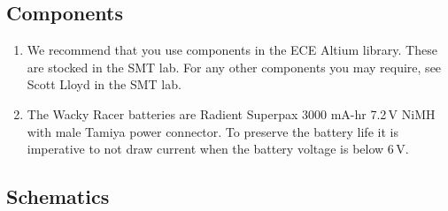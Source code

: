 \documentclass[11pt, a4paper]{article}
\begin{document}
\subsection{Components}

\begin{enumerate}
\item We recommend that you use components in the ECE Altium library.  These
are stocked in the SMT lab.  For any other components you may require,
see Scott Lloyd in the SMT lab.

\item The Wacky Racer batteries are Radient Superpax 3000 mA-hr 7.2\,V
  NiMH with male Tamiya power connector.  To preserve the battery life
  it is imperative to not draw current when the battery voltage is
  below 6\,V.
\end{enumerate}


\subsection{Schematics}
\end{document}
